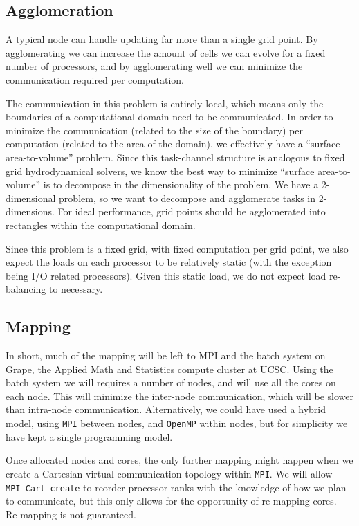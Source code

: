\documentclass[iop, apj]{emulateapj}
\begin{document}
\subsection{Agglomeration}

A typical node can handle updating far more than a single grid point.  By agglomerating we can increase the amount of cells we can evolve for a fixed number of processors, and by agglomerating well we can minimize the communication required per computation.

The communication in this problem is entirely local, which means only the boundaries of a computational domain need to be communicated.  In order to minimize the communication (related to the size of the boundary) per computation (related to the area of the domain), we effectively have a ``surface area-to-volume'' problem.  Since this task-channel structure is analogous to fixed grid hydrodynamical solvers, we know the best way to minimize ``surface area-to-volume'' is to decompose in the dimensionality of the problem.  We have a 2-dimensional problem, so we want to decompose and agglomerate tasks in 2-dimensions. For ideal performance, grid points should be agglomerated into rectangles within the computational domain.

Since this problem is a fixed grid, with fixed computation per grid point, we also expect the loads on each processor to be relatively static (with the exception being I/O related processors). Given this static load, we do not expect load re-balancing to necessary.

\subsection{Mapping}

In short, much of the mapping will be left to MPI and the batch system on Grape, the Applied Math and Statistics compute cluster at UCSC.  Using the batch system we will requires a number of nodes, and will use all the cores on each node. This will minimize the inter-node communication, which will be slower than intra-node communication. Alternatively, we could have used a hybrid model, using \texttt{MPI} between nodes,
and \texttt{OpenMP} within nodes, but for simplicity we have kept a single programming model.

Once allocated nodes and cores, the only further mapping might happen when we create a Cartesian virtual communication topology within \texttt{MPI}.  We will allow \texttt{MPI\_Cart\_create} to reorder processor ranks with the knowledge of how we plan to communicate, but this only allows for the opportunity of re-mapping cores.  Re-mapping is not guaranteed.
\end{document}
